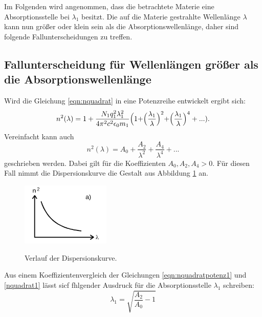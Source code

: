 Im Folgenden wird angenommen, dass die betrachtete Materie eine Absorptionsstelle
bei $\lambda_1$ besitzt. Die auf die Materie gestrahlte Wellenlänge $\lambda$
kann nun größer oder klein sein als die Absorptionswellenlänge, daher sind
folgende Fallunterscheidungen zu treffen.

\subsection{Fallunterscheidung für Wellenlängen größer als die Absorptionswellenlänge} %
Wird die Gleichung \ref{eqn:nquadrat} in eine Potenzreihe entwickelt ergibt
sich:
\begin{equation}
  n^2(\lambda)=1+\frac{N_1 q^{2}_1 \lambda_{1}^{2}}{4\pi^2c^2\epsilon_0 m_1}
  \Bigr(1+\Bigr(\frac{\lambda_1}{\lambda}\Bigl)^2 +\Bigl(\frac{\lambda_1}{\lambda}\Bigr)^4+...).
  \label{eqn:nquadratpotenz1}
\end{equation}
Vereinfacht kann auch
\begin{equation}
 n^2(\lambda)= A_0+\frac{A_2}{\lambda^2}+\frac{A_4}{\lambda^4}+...
 \label{eqn:nquadrat1}
\end{equation}
geschrieben werden.
Dabei gilt für die Koeffizienten $A_0,A_2,A_4>0$.
Für diesen Fall nimmt die Dispersionskurve die Gestalt aus
Abbildung \ref{fig:krumminnen} an.

\begin{figure}[H]
  \centering
  \includegraphics[height=3cm]{n1.png}
  \caption{Verlauf der Dispersionskurve.}
  \label{fig:krumminnen}
  \cite{skript}
\end{figure}

Aus einem Koeffizientenvergleich der Gleichungen \ref{eqn:nquadratpotenz1}
und \ref{nquadrat1} lässt sicf fhlgender Ausdruck für die
Absorptionsstelle $\lambda_1$ schreiben:
\begin{equation}
  \lambda_1=\sqrt{\frac{A_2}{A_0}-1}
  \label{eqn:absorption}
\end{equation}

